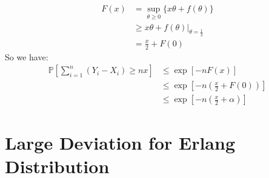 \documentclass{article}
\numberwithin{equation}{section}
\newcommand{\prob}[1]{\mathbb{P}\left[#1\right]}%
\newcommand{\at}[2][]{#1|_{#2}}
\begin{document}
\subsection{}
\begin{align}
F(x) &= \sup_{\theta \ge 0} \{x \theta + f(\theta) \}\\
&\ge x \theta + f(\theta)\at[\bigg]{\theta = \frac{1}{2}}\\
&= \frac{x}{2} + F(0)
\end{align}
So we have:
\begin{align}
\prob{\sum_{i=1}^n (Y_i - X_i)\ge nx} &\le \exp\left[ -n F(x) \right]\\
&\le \exp\left[ -n \left( \frac{x}{2} + F(0) \right) \right]\\
&\le \exp\left[ -n \left( \frac{x}{2} + \alpha \right) \right]
\end{align}

\section{Large Deviation for Erlang Distribution}
\end{document}
